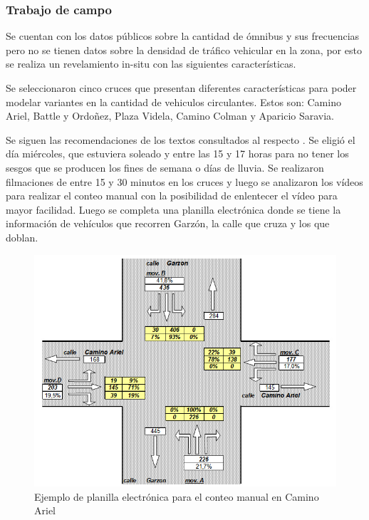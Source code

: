 \subsubsection{Trabajo de campo}
Se cuentan con los datos públicos sobre la cantidad de  ómnibus y sus frecuencias pero no se tienen datos sobre la densidad de tráfico vehicular en la zona, por esto se realiza un revelamiento in-situ con las siguientes características.

Se seleccionaron cinco cruces que presentan diferentes características para poder modelar variantes en la cantidad de vehiculos circulantes.
Estos son: Camino Ariel, Battle y Ordoñez, Plaza Videla, Camino Colman y Aparicio Saravia. 

Se siguen las recomendaciones de los textos consultados al respecto \citep{ConteoTrafico}. Se eligió el día miércoles, que estuviera soleado y entre las 15 y 17 horas para no tener los sesgos que se producen los fines de semana o días de lluvia.
Se realizaron filmaciones de entre 15 y 30 minutos en los cruces y luego se analizaron los vídeos para realizar el conteo manual con la posibilidad de enlentecer el vídeo para mayor facilidad. Luego se completa una planilla electrónica donde se tiene la información de vehículos que recorren Garzón, la calle que cruza y los que doblan. 

\begin{figure}[H]
	\centering
	\includegraphics[width=0.7\linewidth]{Figures/conteo_hoja}
	\caption{Ejemplo de planilla electrónica para el conteo manual en Camino Ariel}
	\label{fig:conteo_hoja}
\end{figure}



